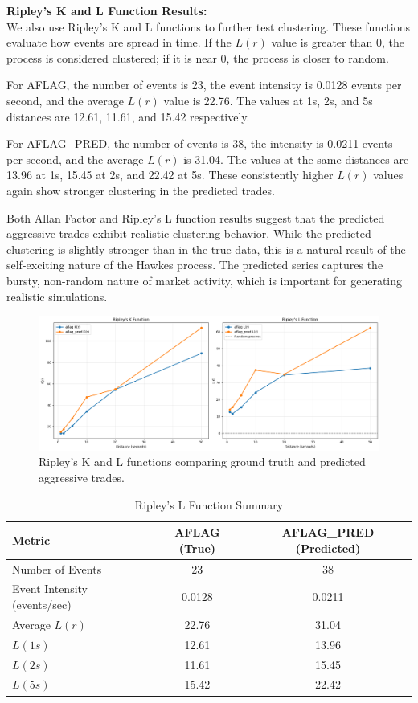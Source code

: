 \noindent\textbf{Ripley's K and L Function Results:} \\
We also use Ripley's K and L functions to further test clustering. These functions evaluate how events are spread in time. If the \( L(r) \) value is greater than 0, the process is considered clustered; if it is near 0, the process is closer to random.

For AFLAG, the number of events is 23, the event intensity is 0.0128 events per second, and the average \( L(r) \) value is 22.76. The values at 1s, 2s, and 5s distances are 12.61, 11.61, and 15.42 respectively.

For AFLAG\_PRED, the number of events is 38, the intensity is 0.0211 events per second, and the average \( L(r) \) is 31.04. The values at the same distances are 13.96 at 1s, 15.45 at 2s, and 22.42 at 5s. These consistently higher \( L(r) \) values again show stronger clustering in the predicted trades.

Both Allan Factor and Ripley's L function results suggest that the predicted aggressive trades exhibit realistic clustering behavior. While the predicted clustering is slightly stronger than in the true data, this is a natural result of the self-exciting nature of the Hawkes process. The predicted series captures the bursty, non-random nature of market activity, which is important for generating realistic simulations.

\begin{figure}[H]
    \centering
    \includegraphics[width=0.9\linewidth]{figures/RIPLEY_181330.png}
    \caption{Ripley's K and L functions comparing ground truth and predicted aggressive trades.}
    \label{fig:ripley-kl}
\end{figure}

\begin{table}[H]
    \centering
    \caption{Ripley's L Function Summary}
    \label{tb:ripley-l}
    \begin{tabular}{lcc}
    \toprule
    \textbf{Metric} & \textbf{AFLAG (True)} & \textbf{AFLAG\_PRED (Predicted)} \\
    \midrule
    Number of Events & 23 & 38 \\
    Event Intensity (events/sec) & 0.0128 & 0.0211 \\
    Average \( L(r) \) & 22.76 & 31.04 \\
    \( L(1s) \) & 12.61 & 13.96 \\
    \( L(2s) \) & 11.61 & 15.45 \\
    \( L(5s) \) & 15.42 & 22.42 \\
    \bottomrule
    \end{tabular}
\end{table}



